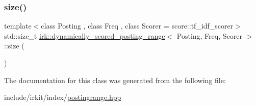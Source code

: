 \mbox{\label{classirk_1_1dynamically__scored__posting__range_ac6024a8e41e31068811e2942f9f751ad}} 
\subsubsection{\texorpdfstring{size()}{size()}}
{\footnotesize\ttfamily template$<$class Posting , class Freq , class Scorer  = score\+::tf\+\_\+idf\+\_\+scorer$>$ \\
std\+::size\+\_\+t \mbox{\hyperlink{classirk_1_1dynamically__scored__posting__range}{irk\+::dynamically\+\_\+scored\+\_\+posting\+\_\+range}}$<$ Posting, Freq, Scorer $>$\+::size (\begin{DoxyParamCaption}{ }\end{DoxyParamCaption})\hspace{0.3cm}{\ttfamily [inline]}}



The documentation for this class was generated from the following file\+:\begin{DoxyCompactItemize}
\item 
include/irkit/index/\mbox{\hyperlink{postingrange_8hpp}{postingrange.\+hpp}}\end{DoxyCompactItemize}

